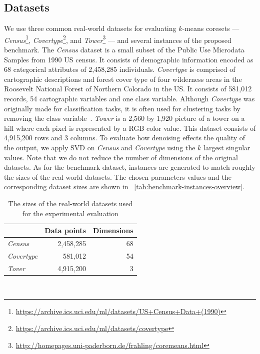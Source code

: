 \subsection{Datasets}
We use three common real-world datasets for evaluating $k$-means coresets 
---
\textit{Census}\footnote{\url{https://archive.ics.uci.edu/ml/datasets/US+Census+Data+(1990)}},
\textit{Covertype}\footnote{\url{https://archive.ics.uci.edu/ml/datasets/covertype}}, and 
\textit{Tower}\footnote{\url{http://homepages.uni-paderborn.de/frahling/coremeans.html}}
---
and several instances of the proposed benchmark. 
The \textit{Census} dataset is a small subset of the Public Use Microdata Samples from 1990 US census. It consists of demographic information encoded as 68 categorical attributes of 2,458,285 individuals. \textit{Covertype} is comprised of cartographic descriptions and forest cover type of four wilderness areas in the Roosevelt National Forest of Northern Colorado in the US. It consists of 581,012 records, 54 cartographic variables and one class variable. Although \textit{Covertype} was originally made for classification tasks, it is often used for clustering tasks by removing the class variable~\cite{AckermannMRSLS12}. \textit{Tower} is a 2,560 by 1,920 picture of a tower on a hill where each pixel is represented by a RGB color value. This dataset consists of 4,915,200 rows and 3 columns. To evaluate how denoising effects the quality of the output, we apply SVD on \textit{Census} and \textit{Covertype} using the $k$ largest singular values. Note that we do not reduce the number of dimensions of the original datasets. As for the benchmark dataset, instances are generated to match roughly the sizes of the real-world datasets. The chosen parameters values and the corresponding dataset sizes are shown in ~\cref{tab:benchmark-instances-overview}. 




%
\begin{table}
	\begin{center}%
	\caption{The sizes of the real-world datasets used for the experimental evaluation}
	\label{tab:real-world-datasets-overview}
	\begin{tabular}{lrr}
		\toprule
        
		    & Data points
		    & Dimensions
            \\
		\midrule
		\textit{Census}
    		& 2,458,285
    		& 68
    		\\
	    \textit{Covertype}
    	    & 581,012
    		& 54
    		\\
        \textit{Tover}
            & 4,915,200
    		& 3
    		\\
		\bottomrule
	\end{tabular}\\
	\end{center}
\end{table}



